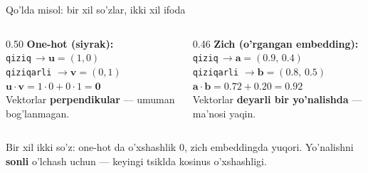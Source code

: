 \documentclass[aspectratio=169,11pt]{beamer}
\begin{document}
\begin{frame}{Qo'lda misol: bir xil so'zlar, ikki xil ifoda}
  \begin{columns}[T]
    \begin{column}{0.50\textwidth}
      \textbf{One-hot (siyrak):}\\[4pt]
      \small
      \texttt{qiziq}\;\;\;\,$\to \mathbf{u}=(1,0)$\\
      \texttt{qiziqarli} $\to \mathbf{v}=(0,1)$\\[5pt]
      $\mathbf{u}\cdot\mathbf{v} = 1{\cdot}0 + 0{\cdot}1 = \mathbf{0}$\\[3pt]
      \footnotesize Vektorlar \textbf{perpendikular} ---
      umuman bog'lanmagan.
    \end{column}
    \begin{column}{0.46\textwidth}
      \textbf{Zich (o'rgangan embedding):}\\[4pt]
      \small
      \texttt{qiziq}\;\;\;\,$\to \mathbf{a}=(0.9,\,0.4)$\\
      \texttt{qiziqarli} $\to \mathbf{b}=(0.8,\,0.5)$\\[5pt]
      $\mathbf{a}\cdot\mathbf{b} = 0.72 + 0.20 = \mathbf{0.92}$\\[3pt]
      \footnotesize Vektorlar \textbf{deyarli bir yo'nalishda} ---
      ma'nosi yaqin.
    \end{column}
  \end{columns}
  \vspace{6pt}
  \begin{tcolorbox}[okbox,title=Muhim kuzatuv,top=2pt,bottom=2pt]
    \footnotesize
    Bir xil ikki so'z: one-hot da o'xshashlik $0$, zich embeddingda
    yuqori. Yo'nalishni \textbf{sonli} o'lchash uchun --- keyingi
    tsiklda kosinus o'xshashligi.
  \end{tcolorbox}
\end{frame}
\end{document}
